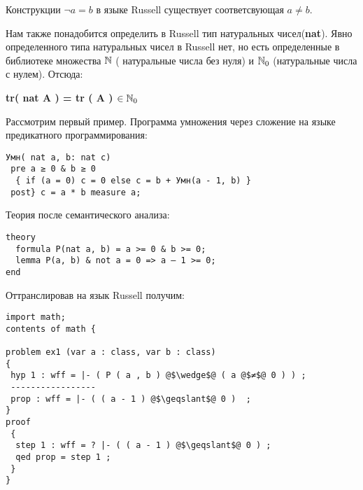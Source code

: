 \documentclass[10pt,a4paper]{article}
\begin{document}
\begin{flushleft}
Конструкции \textbf{$\neg a = b$ } в языке Russell существует  соответсвующая $a \neq b$.
\end{flushleft}
\begin{flushleft}
Нам также понадобится определить в Russell тип натуральных чисел(\textbf{nat}). Явно определенного типа натуральных чисел в Russell нет, но есть определенные в библиотеке множества $\Bbb{N}$ ( натуральные числа без нуля) и  $\Bbb{N}_{0}$ (натуральные числа с нулем). Отсюда:

\textbf{tr( nat A )  =  tr ( A ) $\in \Bbb{N}_{0}$}
\end{flushleft}

\begin{flushleft}
Рассмотрим первый пример. Программа умножения через сложение на языке предикатного программирования:
\end{flushleft}

\begin{flushleft}
\begin{lstlisting}
Умн( nat a, b: nat c)
 pre a ≥ 0 & b ≥ 0
  { if (a = 0) c = 0 else c = b + Умн(a - 1, b) }
 post} c = a * b measure a;
\end{lstlisting}
\begin{flushleft}
Теория после семантического анализа:
\end{flushleft}
\begin{lstlisting}
theory
  formula P(nat a, b) = a >= 0 & b >= 0;
  lemma P(a, b) & not a = 0 => a – 1 >= 0;
end
\end{lstlisting}
\end{flushleft}


\begin{flushleft}
Оттранслировав на язык Russell получим:
\end{flushleft}
\begin{flushleft}
\begin{lstlisting}
import math;
contents of math {

problem ex1 (var а : class, var b : class)
{
 hyp 1 : wff = |- ( P ( a , b ) @$\wedge$@ ( a @$≠$@ 0 ) ) ;
 -----------------
 prop : wff = |- ( ( a - 1 ) @$\geqslant$@ 0 )  ;
}
proof
 {
  step 1 : wff = ? |- ( ( a - 1 ) @$\geqslant$@ 0 ) ;
  qed prop = step 1 ;
 }
}
\end{lstlisting}
\end{flushleft}
\end{document}
